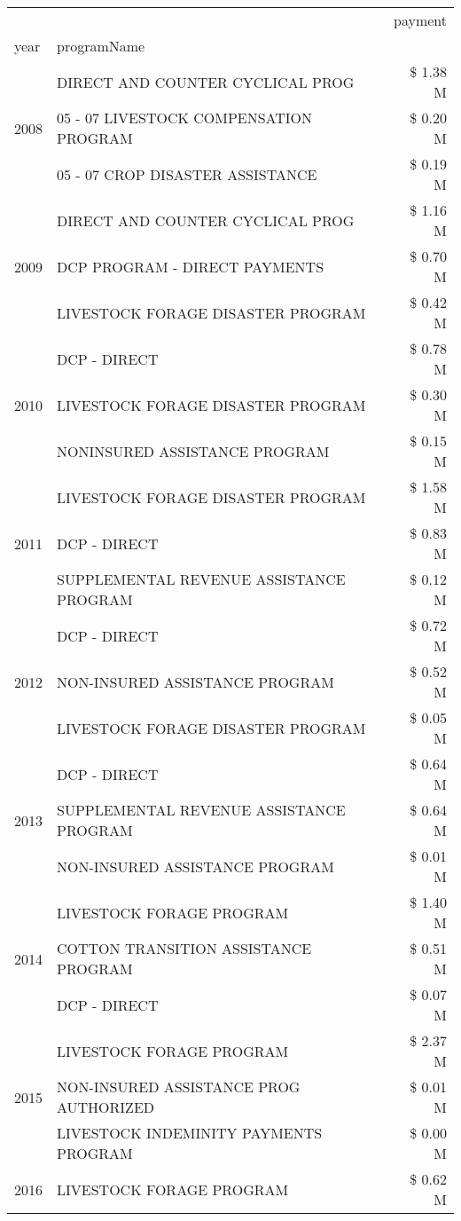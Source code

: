 \begin{tabular}{llr}
\toprule
 &  & payment \\
year & programName &  \\
\midrule
\multirow[t]{3}{*}{2008} & DIRECT AND COUNTER CYCLICAL PROG & \$ 1.38 M \\
 & 05 - 07 LIVESTOCK COMPENSATION PROGRAM & \$ 0.20 M \\
 & 05 - 07 CROP DISASTER ASSISTANCE & \$ 0.19 M \\
\cline{1-3}
\multirow[t]{3}{*}{2009} & DIRECT AND COUNTER CYCLICAL PROG & \$ 1.16 M \\
 & DCP PROGRAM - DIRECT PAYMENTS & \$ 0.70 M \\
 & LIVESTOCK FORAGE DISASTER  PROGRAM & \$ 0.42 M \\
\cline{1-3}
\multirow[t]{3}{*}{2010} & DCP - DIRECT & \$ 0.78 M \\
 & LIVESTOCK FORAGE DISASTER PROGRAM & \$ 0.30 M \\
 & NONINSURED ASSISTANCE PROGRAM & \$ 0.15 M \\
\cline{1-3}
\multirow[t]{3}{*}{2011} & LIVESTOCK FORAGE DISASTER PROGRAM & \$ 1.58 M \\
 & DCP - DIRECT & \$ 0.83 M \\
 & SUPPLEMENTAL REVENUE ASSISTANCE PROGRAM & \$ 0.12 M \\
\cline{1-3}
\multirow[t]{3}{*}{2012} & DCP - DIRECT & \$ 0.72 M \\
 & NON-INSURED ASSISTANCE PROGRAM & \$ 0.52 M \\
 & LIVESTOCK FORAGE DISASTER PROGRAM & \$ 0.05 M \\
\cline{1-3}
\multirow[t]{3}{*}{2013} & DCP - DIRECT & \$ 0.64 M \\
 & SUPPLEMENTAL REVENUE ASSISTANCE PROGRAM & \$ 0.64 M \\
 & NON-INSURED ASSISTANCE PROGRAM & \$ 0.01 M \\
\cline{1-3}
\multirow[t]{3}{*}{2014} & LIVESTOCK FORAGE PROGRAM & \$ 1.40 M \\
 & COTTON TRANSITION ASSISTANCE PROGRAM & \$ 0.51 M \\
 & DCP - DIRECT & \$ 0.07 M \\
\cline{1-3}
\multirow[t]{3}{*}{2015} & LIVESTOCK FORAGE PROGRAM & \$ 2.37 M \\
 & NON-INSURED ASSISTANCE PROG AUTHORIZED & \$ 0.01 M \\
 & LIVESTOCK INDEMINITY PAYMENTS PROGRAM & \$ 0.00 M \\
\cline{1-3}
\multirow[t]{3}{*}{2016} & LIVESTOCK FORAGE PROGRAM & \$ 0.62 M \\

\end{tabular}

